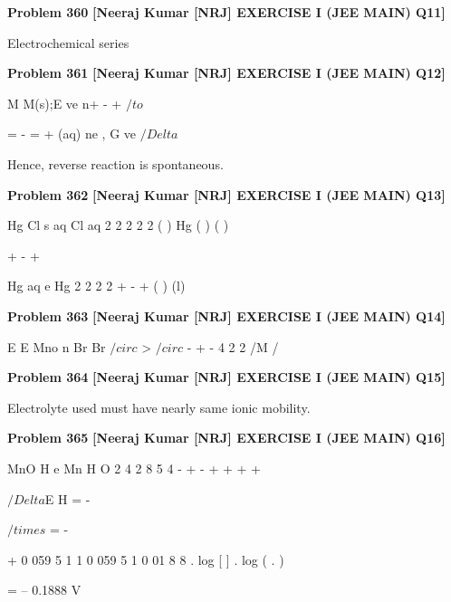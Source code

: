 \begin{problembox}
\textbf{Problem 360} \hfill \textbf{[Neeraj Kumar [NRJ] EXERCISE I (JEE MAIN) Q11]}
\label{q:ext-nrj_all_questions-360}

Electrochemical series
\end{problembox}

\begin{problembox}
\textbf{Problem 361} \hfill \textbf{[Neeraj Kumar [NRJ] EXERCISE I (JEE MAIN) Q12]}
\label{q:ext-nrj_all_questions-361}

M
M(s);E
ve
n+
-
+
 $/to$
 
= -
= +
(aq)
ne
,
G
ve
$/Delta$
 
 Hence, reverse reaction is spontaneous.
\end{problembox}

\begin{problembox}
\textbf{Problem 362} \hfill \textbf{[Neeraj Kumar [NRJ] EXERCISE I (JEE MAIN) Q13]}
\label{q:ext-nrj_all_questions-362}

Hg Cl
s
aq
Cl
aq
2
2
2
2
2
( )
Hg
(
)
(
)

  


 



+
-
+
 
 
Hg
aq
e
Hg
2
2
2
2
+
-
+
(
)
(l)

  


 
\end{problembox}

\begin{problembox}
\textbf{Problem 363} \hfill \textbf{[Neeraj Kumar [NRJ] EXERCISE I (JEE MAIN) Q14]}
\label{q:ext-nrj_all_questions-363}

E
E
Mno
n
Br
Br
$/circ$
>
$/circ$
-
+
-
4
2
2
/M
/
\end{problembox}

\begin{problembox}
\textbf{Problem 364} \hfill \textbf{[Neeraj Kumar [NRJ] EXERCISE I (JEE MAIN) Q15]}
\label{q:ext-nrj_all_questions-364}

Electrolyte used must have nearly same ionic 
mobility.
\end{problembox}

\begin{problembox}
\textbf{Problem 365} \hfill \textbf{[Neeraj Kumar [NRJ] EXERCISE I (JEE MAIN) Q16]}
\label{q:ext-nrj_all_questions-365}

MnO
H
e
Mn
H O
2
4
2
8
5
4
-
+
-
+
+
+
+

  


 



 
 
$/Delta$E
H
= -
 
$/times$
= -
 
+
0 059
5
1
1
0 059
5
1
0 01
8
8
.
log
[
]
.
log
( .
)
 
 = -- 0.1888 V
\end{problembox}

